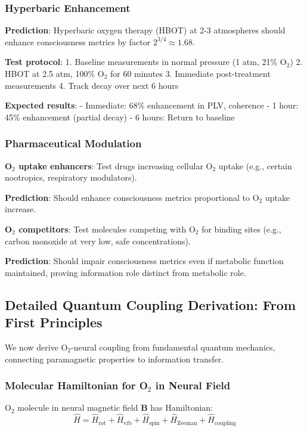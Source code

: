 \documentclass[11pt,onecolumn]{article}
\begin{document}
\subsubsection{Hyperbaric Enhancement}

\textbf{Prediction}: Hyperbaric oxygen therapy (HBOT) at 2-3 atmospheres should enhance consciousness metrics by factor $2^{3/4} \approx 1.68$.

\textbf{Test protocol}:
1. Baseline measurements in normal pressure (1 atm, 21\% O$_2$)
2. HBOT at 2.5 atm, 100\% O$_2$ for 60 minutes
3. Immediate post-treatment measurements
4. Track decay over next 6 hours

\textbf{Expected results}:
- Immediate: 68\% enhancement in PLV, coherence  
- 1 hour: 45\% enhancement (partial decay)
- 6 hours: Return to baseline

\subsubsection{Pharmaceutical Modulation}

\textbf{O$_2$ uptake enhancers}: Test drugs increasing cellular O$_2$ uptake (e.g., certain nootropics, respiratory modulators).

\textbf{Prediction}: Should enhance consciousness metrics proportional to O$_2$ uptake increase.

\textbf{O$_2$ competitors}: Test molecules competing with O$_2$ for binding sites (e.g., carbon monoxide at very low, safe concentrations).

\textbf{Prediction}: Should impair consciousness metrics even if metabolic function maintained, proving information role distinct from metabolic role.

\subsection{Detailed Quantum Coupling Derivation: From First Principles}

We now derive O$_2$-neural coupling from fundamental quantum mechanics, connecting paramagnetic properties to information transfer.

\subsubsection{Molecular Hamiltonian for O$_2$ in Neural Field}

O$_2$ molecule in neural magnetic field $\mathbf{B}$ has Hamiltonian:
\begin{equation}
\hat{H} = \hat{H}_{\text{rot}} + \hat{H}_{\text{vib}} + \hat{H}_{\text{spin}} + \hat{H}_{\text{Zeeman}} + \hat{H}_{\text{coupling}}
\end{equation}
\end{document}
